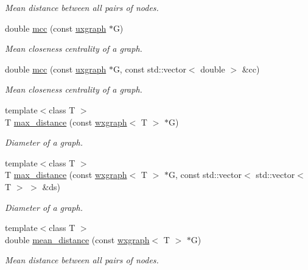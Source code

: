 \begin{DoxyCompactItemize}
\begin{DoxyCompactList}\small\item\em Mean distance between all pairs of nodes. \end{DoxyCompactList}\item 
double \hyperlink{namespacelgraph_1_1networks_1_1metrics_1_1distance_a29f1194ca5bd104ae062792a6df1c401}{mcc} (const \hyperlink{classlgraph_1_1uxgraph}{uxgraph} $\ast$G)
\begin{DoxyCompactList}\small\item\em Mean closeness centrality of a graph. \end{DoxyCompactList}\item 
double \hyperlink{namespacelgraph_1_1networks_1_1metrics_1_1distance_a80312d952679dca4ec5249298f12d156}{mcc} (const \hyperlink{classlgraph_1_1uxgraph}{uxgraph} $\ast$G, const std\-::vector$<$ double $>$ \&cc)
\begin{DoxyCompactList}\small\item\em Mean closeness centrality of a graph. \end{DoxyCompactList}\item 
{\footnotesize template$<$class T $>$ }\\T \hyperlink{namespacelgraph_1_1networks_1_1metrics_1_1distance_ab497d212293a672c1b511f3e9224603d}{max\-\_\-distance} (const \hyperlink{classlgraph_1_1wxgraph}{wxgraph}$<$ T $>$ $\ast$G)
\begin{DoxyCompactList}\small\item\em Diameter of a graph. \end{DoxyCompactList}\item 
{\footnotesize template$<$class T $>$ }\\T \hyperlink{namespacelgraph_1_1networks_1_1metrics_1_1distance_ab8e7a10f4ecd1e1babf463b151027fa5}{max\-\_\-distance} (const \hyperlink{classlgraph_1_1wxgraph}{wxgraph}$<$ T $>$ $\ast$G, const std\-::vector$<$ std\-::vector$<$ T $>$ $>$ \&ds)
\begin{DoxyCompactList}\small\item\em Diameter of a graph. \end{DoxyCompactList}\item 
{\footnotesize template$<$class T $>$ }\\double \hyperlink{namespacelgraph_1_1networks_1_1metrics_1_1distance_a17eab7f8ea3692a6f531219ebd567a2f}{mean\-\_\-distance} (const \hyperlink{classlgraph_1_1wxgraph}{wxgraph}$<$ T $>$ $\ast$G)
\begin{DoxyCompactList}\small\item\em Mean distance between all pairs of nodes. \end{DoxyCompactList}\item 

\end{DoxyCompactItemize}
